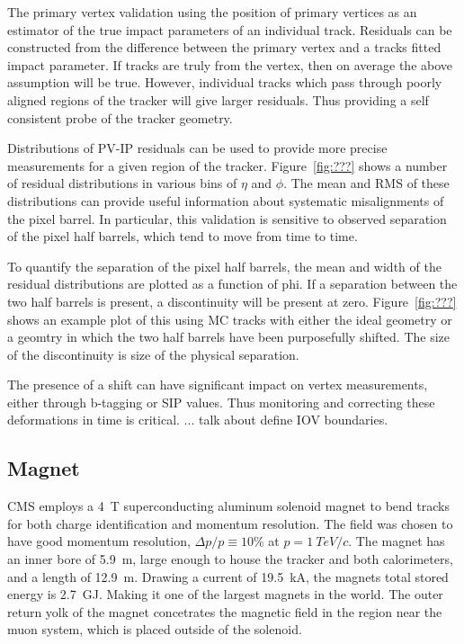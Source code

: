 The primary vertex validation using the position of primary vertices as
an estimator of the true impact parameters of an individual track.  
Residuals can be constructed from the difference between the primary 
vertex and a tracks fitted impact parameter.    If tracks are truly from 
the vertex, then on average the above assumption
will be true.  However, individual tracks which pass through poorly 
aligned regions of the tracker will give larger residuals.  Thus providing
a self consistent probe of the tracker geometry.  

Distributions of PV-IP residuals can be used to provide more precise 
measurements for a given region of the tracker.  Figure~\ref{fig:???}
shows a number of residual distributions in various bins of $\eta$ and
$\phi$.  The mean and RMS of these distributions can provide useful
information about systematic misalignments of the pixel barrel.  In
particular, this validation is sensitive to observed separation of the
pixel half barrels, which tend to move from time to time. 

To quantify the separation of the pixel half barrels, the mean and width
of the residual distributions are plotted as a function of phi.  If a 
separation between the two half barrels is present, a discontinuity will
be present at zero.  Figure~\ref{fig:???} shows an example plot of this
using MC tracks with either the ideal geometry or a geomtry in which the 
two half barrels have been purposefully shifted.  The size of the
discontinuity is size of the physical separation.  

The presence of a shift can have significant impact on vertex measurements,
either through b-tagging or SIP values.  Thus monitoring and correcting
these deformations in time is critical.  ... talk about define IOV 
boundaries. 

\subsection{Magnet}
\label{sec:Magnet}

CMS employs a 4~T superconducting aluminum solenoid magnet to bend tracks for 
both charge identification and momentum resolution.  The field was
chosen to have good momentum resolution, $\Delta p/p\equiv10\%$ at 
$p=1~TeV/c$.  The magnet has an inner bore of 5.9~m, large enough to house
the tracker and both calorimeters, and a length of 12.9~m.  Drawing a 
current of 19.5~kA, the magnets total stored energy is 2.7~GJ.  Making it
one of the largest magnets in the world.  
The outer return yolk of the magnet concetrates the magnetic field in the
region near the muon system, which is placed outside of the solenoid.  

